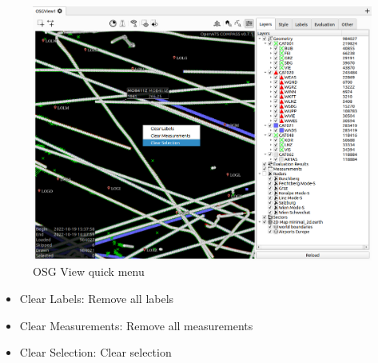 \begin{figure}[H]
    \hspace*{-2.5cm}
    \includegraphics[width=19cm,frame]{figures/osgview_quick_operations.png}
  \caption{OSG View quick menu}
\end{figure}

\begin{itemize}
 \item Clear Labels: Remove all labels
 \item Clear Measurements: Remove all measurements
 \item Clear Selection: Clear selection
\end{itemize}


% 
% 
% 

